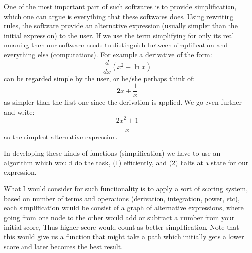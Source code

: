 \documentclass[9pt,a4paper,twocolumn]{article}
\begin{document}
            One of the most important part of such softwares is to provide simplification, which one can argue is everything that these softwares does. Using rewriting rules, the software provide an alternative expression (usually simpler than the initial expression) to the user. If we use the term simplifying for only its real meaning then our software needs to distinguish between simplification and everything else (computations). For example a derivative of the form:
            \begin{equation}
                \frac{d}{dx}\left(
                    x^2 + \ln x 
                \right)
            \end{equation}
            can be regarded simple by the user, or he/she perhaps think of:
            \begin{equation}
                2 x + \frac 1x
            \end{equation}
            as simpler than the first one since the derivation is applied. We go even further and write:
            \begin{equation}
                \frac{2x^2 + 1}{x}
            \end{equation}
            as the simplest alternative expression.

            In developing these kinds of functions (simplification) we have to use an algorithm which would do the task, (1) efficiently, and (2) halts at a state for our expression.

            What I would consider for such functionality is to apply a sort of scoring system, based on number of terms and operations (derivation, integration, power, etc), each simplification would be consist of a graph of alternative expressions, where going from one node to the other would add or subtract a number from your initial score, Thus higher score would count as better simplification. Note that this would give us a function that might take a path which initially gets a lower score and later becomes the best result.
\end{document}
